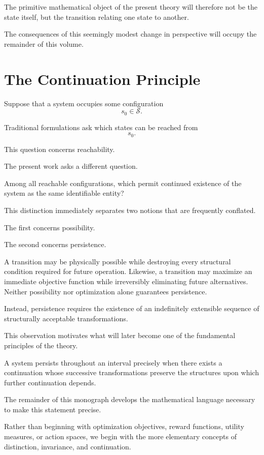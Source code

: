 \documentclass[11pt]{book}
\numberwithin{equation}{chapter}
\theoremstyle{definition}
\theoremstyle{plain}
\begin{document}
The primitive mathematical object of the present theory will therefore not be the state itself, but the transition relating one state to another.

The consequences of this seemingly modest change in perspective will occupy the remainder of this volume.

\section{The Continuation Principle}

Suppose that a system occupies some configuration
\[
s_0 \in \mathcal{S}.
\]

Traditional formulations ask which states can be reached from
\[
s_0.
\]

This question concerns reachability.

The present work asks a different question.

Among all reachable configurations, which permit continued existence of the system as the same identifiable entity?

This distinction immediately separates two notions that are frequently conflated.

The first concerns possibility.

The second concerns persistence.

A transition may be physically possible while destroying every structural condition required for future operation. Likewise, a transition may maximize an immediate objective function while irreversibly eliminating future alternatives. Neither possibility nor optimization alone guarantees persistence.

Instead, persistence requires the existence of an indefinitely extensible sequence of structurally acceptable transformations.

This observation motivates what will later become one of the fundamental principles of the theory.

A system persists throughout an interval precisely when there exists a continuation whose successive transformations preserve the structures upon which further continuation depends.

The remainder of this monograph develops the mathematical language necessary to make this statement precise.

Rather than beginning with optimization objectives, reward functions, utility measures, or action spaces, we begin with the more elementary concepts of distinction, invariance, and continuation.
\end{document}
